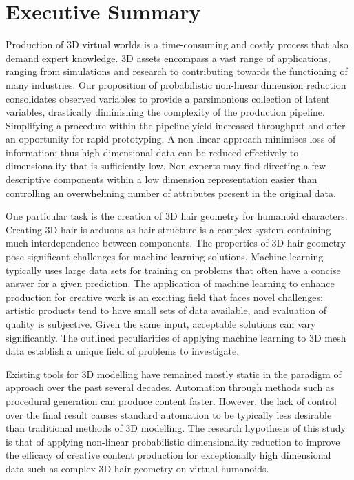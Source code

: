 \documentclass[ %
author={Dillon Keith Diep},
supervisor={Dr. Carl Henrik Ek},
degree={MEng},
title={ART-CG:},
subtitle={Assisted Real-time Content Generation of 3D Hair by Learning Manifolds},
type={Research},
year={2017} ]{dissertation}
\begin{document}
\chapter*{Executive Summary}
Production of 3D virtual worlds is a time-consuming and costly process that also demand expert knowledge. 3D assets encompass a vast range of applications, ranging from simulations and research to contributing towards the functioning of many industries. Our proposition of probabilistic non-linear dimension reduction consolidates observed variables to provide a parsimonious collection of latent variables, drastically diminishing the complexity of the production pipeline. Simplifying a procedure within the pipeline yield increased throughput and offer an opportunity for rapid prototyping. A non-linear approach minimises loss of information; thus high dimensional data can be reduced effectively to dimensionality that is sufficiently low. Non-experts may find directing a few descriptive components within a low dimension representation easier than controlling an overwhelming number of attributes present in the original data.

One particular task is the creation of 3D hair geometry for humanoid characters. Creating 3D hair is arduous as hair structure is a complex system containing much interdependence between components. The properties of 3D hair geometry pose significant challenges for machine learning solutions. Machine learning typically uses large data sets for training on problems that often have a concise answer for a given prediction. The application of machine learning to enhance production for creative work is an exciting field that faces novel challenges: artistic products tend to have small sets of data available, and evaluation of quality is subjective. Given the same input, acceptable solutions can vary significantly. The outlined peculiarities of applying machine learning to 3D mesh data establish a unique field of problems to investigate.

Existing tools for 3D modelling have remained mostly static in the paradigm of approach over the past several decades. Automation through methods such as procedural generation can produce content faster. However, the lack of control over the final result causes standard automation to be typically less desirable than traditional methods of 3D modelling. The research hypothesis of this study is that of applying non-linear probabilistic dimensionality reduction to improve the efficacy of creative content production for exceptionally high dimensional data such as complex 3D hair geometry on virtual humanoids.
\end{document}
